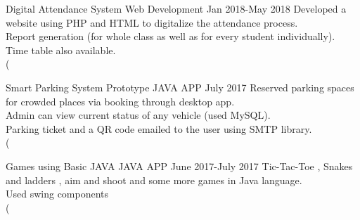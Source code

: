    
\begin{entryzlist}
\entryz

{Digital Attendance System {\normalfont Web Development }}
{Jan 2018-May 2018}
{\small Developed a website using PHP and HTML to digitalize the attendance process. 
\\
Report generation (for whole class as well as for every student individually).
\\
Time table also available.
\\
(}

\entryz

{Smart Parking System Prototype {\normalfont JAVA APP }}
{July 2017}
{\small Reserved parking spaces for crowded places via booking through desktop 
app.
\\
Admin can view current status of any vehicle (used MySQL). 
\\
Parking ticket and a QR code emailed to the user using SMTP library.
\\
(}

\entryz

{Games using Basic JAVA {\normalfont JAVA APP }}
{June 2017-July 2017}
{\small Tic-Tac-Toe , Snakes and ladders , aim and shoot and some more games 
in Java language.
\\
Used swing components
\\
(}


\end{entryzlist}